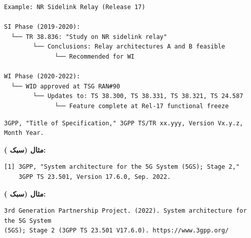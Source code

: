 
\def\CNcodelang{}

\begin{CNplaincode}
\begin{Verbatim}
Example: NR Sidelink Relay (Release 17)

SI Phase (2019-2020):
  └── TR 38.836: "Study on NR sidelink relay"
        └── Conclusions: Relay architectures A and B feasible
              └── Recommended for WI

WI Phase (2020-2022):
  └── WID approved at TSG RAN#90
        └── Updates to: TS 38.300, TS 38.331, TS 38.321, TS 24.587
              └── Feature complete at Rel-17 functional freeze
\end{Verbatim}
\end{CNplaincode}



\CNchained{}

\def\CNcodelang{}

\begin{CNplaincode}
\begin{Verbatim}
3GPP, "Title of Specification," 3GPP TS/TR xx.yyy, Version Vx.y.z, Month Year.
\end{Verbatim}
\end{CNplaincode}

\textbf{مثال (سبک ):}

\def\CNcodelang{}

\begin{CNplaincode}
\begin{Verbatim}
[1] 3GPP, "System architecture for the 5G System (5GS); Stage 2,"
    3GPP TS 23.501, Version 17.6.0, Sep. 2022.
\end{Verbatim}
\end{CNplaincode}

\textbf{مثال (سبک ):}

\def\CNcodelang{}

\begin{CNplaincode}
\begin{Verbatim}
3rd Generation Partnership Project. (2022). System architecture for the 5G System
(5GS); Stage 2 (3GPP TS 23.501 V17.6.0). https://www.3gpp.org/
\end{Verbatim}
\end{CNplaincode}

